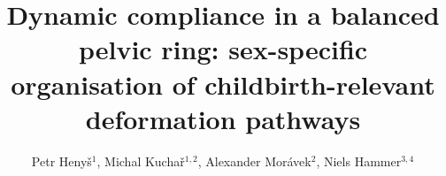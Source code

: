 \documentclass[openacc]{rsproca_new}
\begin{document}
\title{Dynamic compliance in a balanced pelvic ring: sex-specific organisation of childbirth-relevant deformation pathways}

\author{Petr Heny\v{s}$^{1}$, Michal Kucha\v{r}$^{1,2}$, Alexander Mor\'{a}vek$^{2}$, Niels Hammer$^{3,4}$}

\address{$^{1}$Institute of New Technologies and Applied Informatics, Faculty of Mechatronics, Informatics and Interdisciplinary Studies, Technical University of Liberec, Liberec, Czech Republic\\
$^{2}$Department of Anatomy, Faculty of Medicine in Hradec Kr\'{a}lov\'{e}, Charles University, Hradec Kr\'{a}lov\'{e}, Czech Republic\\
$^{3}$Division of Macroscopic and Clinical Anatomy, Gottfried Schatz Research Center, Medical University of Graz, Graz, Austria\\
$^{4}$Division of Macroscopic and Clinical Anatomy, Gottfried Schatz Research Center, Medical University of Graz, Graz, Austria; Department of Orthopedic and Trauma Surgery, University of Leipzig, Leipzig, Germany; Division of Biomechatronics, Fraunhofer IWU, Dresden, Germany}

\subject{biomechanics, evolutionary anthropology, obstetrics}


\end{document}
